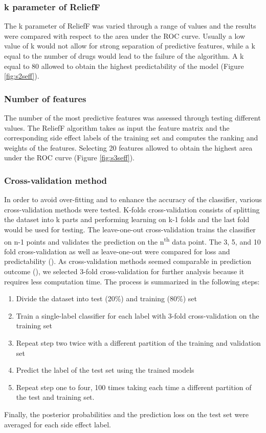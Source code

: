 \subsubsection{k parameter of ReliefF}
The k parameter of ReliefF was varied through a range of values and the results were compared with respect to the area under the ROC curve. Usually a low value of k would not allow for strong separation of predictive features, while a k equal to the number of drugs would lead to the failure of the algorithm. A k equal to 80 allowed to obtain the highest predictability of the model (Figure \ref{fig:s2seff}).
\subsubsection{Number of features}
The number of the most predictive features was assessed through testing different values. The ReliefF algorithm takes as input the feature matrix and the corresponding side effect labels of the training set and computes the ranking and weights of the features. Selecting 20 features allowed to obtain the highest area under the ROC curve (Figure \ref{fig:s3seff}).
\subsubsection{Cross-validation method}
In order to avoid over-fitting and to enhance the accuracy of the classifier, various cross-validation methods were tested. K-folds cross-validation consists of splitting the dataset into k parts and performing learning on k-1 folds and the last fold would be used for testing. The leave-one-out cross-validation trains the classifier on n-1 points and validates the prediction on the n\textsuperscript{th} data point. The 3, 5, and 10 fold cross-validation as well as leave-one-out were compared for loss and predictability (). As cross-validation methods seemed comparable in prediction outcome (), we selected 3-fold cross-validation for further analysis because it requires less computation time. The process is summarized in the following steps:
\begin{enumerate}
\item	Divide the dataset into test (20\%) and training (80\%) set	
\item	Train a single-label classifier for each label with 3-fold cross-validation on the training set
\item	Repeat step two twice with a different partition of the training and validation set
\item	Predict the label of the test set using the trained models
\item	Repeat step one to four, 100 times taking each time a different partition of the test and training set.
\end{enumerate}
Finally, the posterior probabilities and the prediction loss on the test set were averaged for each side effect label.
